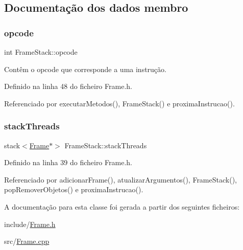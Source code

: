 \subsection{Documentação dos dados membro}
\mbox{\label{classFrameStack_afbf19cd37c13a8058ab600205337c889}} 
\subsubsection{\texorpdfstring{opcode}{opcode}}
{\footnotesize\ttfamily int Frame\+Stack\+::opcode\hspace{0.3cm}{\ttfamily [private]}}



Contêm o opcode que corresponde a uma instrução. 



Definido na linha 48 do ficheiro Frame.\+h.



Referenciado por executar\+Metodos(), Frame\+Stack() e proxima\+Instrucao().

\mbox{\label{classFrameStack_a99712833509e9c94197fa964fbf7965b}} 
\subsubsection{\texorpdfstring{stack\+Threads}{stackThreads}}
{\footnotesize\ttfamily stack$<$\hyperlink{Frame_8h_acc380914b41a084dcc8e4b38fb200145}{Frame}$\ast$$>$ Frame\+Stack\+::stack\+Threads\hspace{0.3cm}{\ttfamily [private]}}



Definido na linha 39 do ficheiro Frame.\+h.



Referenciado por adicionar\+Frame(), atualizar\+Argumentos(), Frame\+Stack(), pop\+Remover\+Objetos() e proxima\+Instrucao().



A documentação para esta classe foi gerada a partir dos seguintes ficheiros\+:\begin{DoxyCompactItemize}
\item 
include/\hyperlink{Frame_8h}{Frame.\+h}\item 
src/\hyperlink{Frame_8cpp}{Frame.\+cpp}\end{DoxyCompactItemize}
